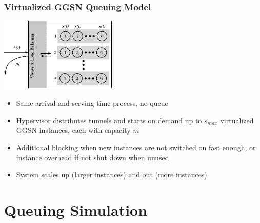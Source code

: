 \documentclass{beamer}
\begin{document}
\begin{frame}
	\frametitle{Virtualized GGSN Queuing Model}
		\begin{center}
			\includegraphics[height=3.5cm]{../../chapters/04-mobilenets/images/ggsn-virtualized.pdf}
		\end{center}

		\begin{itemize}
			\item Same arrival and serving time process, no queue
			\item Hypervisor distributes tunnels and starts on demand up to $s_{max}$ virtualized GGSN instances, each with capacity $m$
			\item Additional blocking when new instances are not switched on fast enough, or instance overhead if not shut down when unused
			\item System scales up (larger instances) and out (more instances)
		\end{itemize}
\end{frame}


\section{Queuing Simulation}
\end{document}

